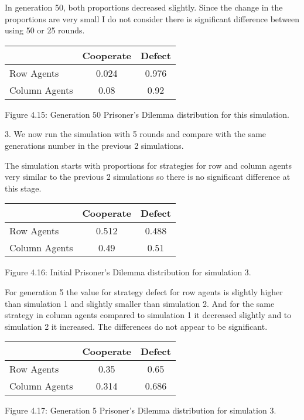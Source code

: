 \documentclass{article}
\begin{document}
In generation 50, both proportions decreased slightly. Since the change in the proportions are very small I do not consider there is significant difference between using 50 or 25 rounds.
\begin{center}
\begin{tabular}{|l|c|c|}
\hline
& Cooperate & Defect \\ 
\hline
Row Agents & 0.024 & 0.976\\
\hline
Column Agents & 0.08 & 0.92\\
\hline
\end{tabular}
\end{center}
\begin{center}
Figure 4.15: Generation 50 Prisoner’s Dilemma distribution for this simulation.
\end{center}

3. We now run the simulation with 5 rounds and compare with the same generations number in the previous 2 simulations.

The simulation starts with proportions for strategies for row and column agents very similar to the previous 2 simulations so there is no significant difference at this stage.
\begin{center}
\begin{tabular}{|l|c|c|}
\hline
& Cooperate & Defect \\ 
\hline
Row Agents & 0.512 & 0.488\\
\hline
Column Agents & 0.49 & 0.51\\
\hline
\end{tabular}
\end{center}
\begin{center}
Figure 4.16: Initial Prisoner’s Dilemma distribution for simulation 3.
\end{center}

 For generation 5 the value for strategy defect for row agents is slightly higher than simulation 1 and slightly smaller than simulation 2. And for the same strategy in column agents compared to simulation 1 it decreased slightly and to simulation 2 it increased. The differences do not appear to be significant.
\begin{center}
\begin{tabular}{|l|c|c|}
\hline
& Cooperate & Defect \\ 
\hline
Row Agents & 0.35 & 0.65\\
\hline
Column Agents & 0.314 & 0.686\\
\hline
\end{tabular}
\end{center}
\begin{center}
Figure 4.17: Generation 5 Prisoner’s Dilemma distribution for simulation 3.
\end{center}
\end{document}
